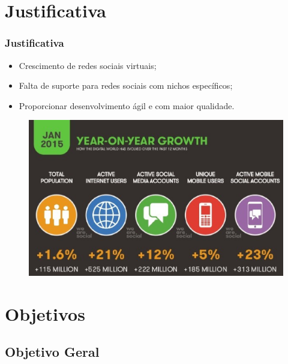 \documentclass{beamer}
\begin{document}
\section{Justificativa}

\begin{frame}
\frametitle{Justificativa}

\begin{itemize}
	\item Crescimento de redes sociais virtuais;
	\item Falta de suporte para redes sociais com nichos específicos;
	\item Proporcionar desenvolvimento ágil e com maior qualidade.
\end{itemize}

\begin{figure}[h]
	\centering
	\includegraphics[scale=0.35]{../figuras/introducao/crescimento.eps}
\end{figure}

\end{frame}


\section{Objetivos}
\subsection{Objetivo Geral}
\end{document}
